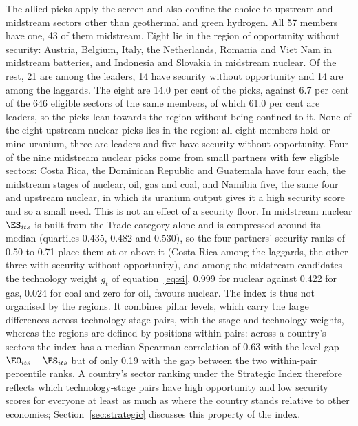 The allied picks apply the screen and also confine the choice to upstream and midstream sectors
other than geothermal and green hydrogen. All 57 members have one, 43 of them midstream. Eight
lie in the region of opportunity without security: Austria, Belgium, Italy, the Netherlands,
Romania and Viet Nam in midstream batteries, and Indonesia and Slovakia in midstream nuclear. Of
the rest, 21 are among the leaders, 14 have security without opportunity and 14 are among the
laggards. The eight are 14.0 per cent of the picks, against 6.7 per cent of the 646 eligible
sectors of the same members, of which 61.0 per cent are leaders, so the picks lean towards the
region without being confined to it. None of the eight upstream nuclear picks lies in the region:
all eight members hold or mine uranium, three are leaders and five have security without
opportunity. Four of the nine midstream nuclear picks come from small partners with few eligible
sectors: Costa Rica, the Dominican Republic and Guatemala have four each, the midstream stages of
nuclear, oil, gas and coal, and Namibia five, the same four and upstream nuclear, in which its
uranium output gives it a high security score and so a small need. This is not an effect of a
security floor. In midstream nuclear $\ES_{its}$ is built from the Trade category alone and is
compressed around its median (quartiles 0.435, 0.482 and 0.530), so the four partners' security
ranks of 0.50 to 0.71 place them at or above it (Costa Rica among the laggards, the other
three with security without opportunity), and among the midstream candidates the technology
weight $g_t$ of equation~\eqref{eq:si}, 0.999 for nuclear against 0.422 for gas, 0.024 for coal
and zero for oil, favours nuclear. The index is thus not organised by the regions. It combines
pillar levels, which carry the large differences across technology-stage pairs, with the stage
and technology weights, whereas the regions are defined by positions within pairs: across a
country's sectors the index has a median Spearman correlation of 0.63 with the level gap
$\EO_{its}-\ES_{its}$ but of only 0.19 with the gap between the two within-pair percentile ranks.
A country's sector ranking under the Strategic Index therefore reflects which technology-stage
pairs have high opportunity and low security scores for everyone at least as much as where the
country stands relative to other economies; Section~\ref{sec:strategic} discusses this property
of the index.

